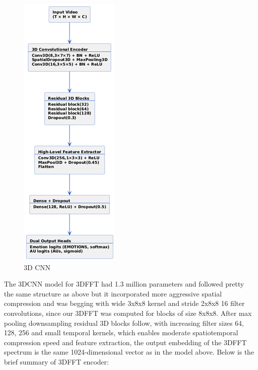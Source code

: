 \documentclass{article}
\begin{document}
\begin{figure}[H]
  \begin{center}
    \includegraphics*[scale=0.8]{Figures/Picture3.png}
  \end{center}
  \caption{3D CNN}
  \label{fig:fig3}
\end{figure}

The 3DCNN model for 3DFFT had 1.3 million parameters and followed pretty the same structure as above but it incorporated more aggressive spatial compression and was begging with wide 3x8x8 kernel and stride 2x8x8 16 filter convolutions, since our 3DFFT was computed for blocks of size 8x8x8. After max pooling downsampling residual 3D blocks follow, with increasing filter sizes 64, 128, 256 and small temporal kernels, which enables moderate spatiotemporal compression speed and feature extraction, the output embedding of the 3DFFT spectrum is the same 1024-dimensional vector as in the model above. Below is the brief summary of 3DFFT encoder:
\end{document}

